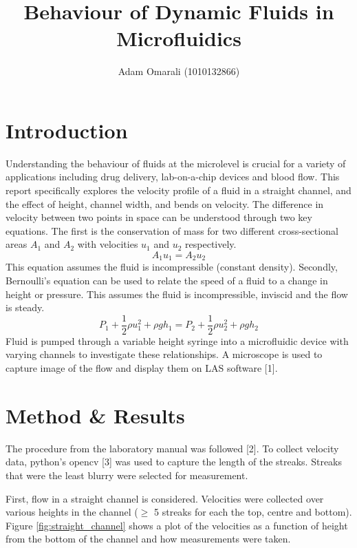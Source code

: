 \documentclass[12pt]{article}
\begin{document}
\vspace{-5cm}
\title{\bf{Behaviour of Dynamic Fluids in Microfluidics}}
\author{Adam Omarali (1010132866)}
\maketitle

\section{Introduction}
Understanding the behaviour of fluids at the microlevel is crucial for a variety of applications including drug delivery, lab-on-a-chip devices and blood flow. 
This report specifically explores the velocity profile of a fluid in a straight channel, and the effect of height, channel width, and bends on velocity.
The difference in velocity between two points in space can be understood through two key equations. The first is the conservation of mass for two different cross-sectional areas $A_1$ and $A_2$ with velocities $u_1$ and $u_2$ respectively.
\begin{equation}
    A_1u_1 = A_2u_2
    \label{eq:mass}
\end{equation}
This equation assumes the fluid is incompressible (constant density).
Secondly, Bernoulli's equation can be used to relate the speed of a fluid to a change in height or pressure. This assumes the fluid is incompressible, inviscid and the flow is steady.
\begin{equation}
    P_1 + \frac{1}{2}\rho u_1^2 + \rho gh_1 = P_2 + \frac{1}{2}\rho u_2^2 + \rho gh_2
    \label{eq:bernoulli}
\end{equation}
Fluid is pumped through a variable height syringe into a microfluidic device with varying channels to investigate these relationships. A microscope is used to capture image of the flow and display them on LAS software [1].

\section{Method \& Results}
The procedure from the laboratory manual was followed [2]. To collect velocity data, python's opencv [3] was used to capture the length of the streaks.
Streaks that were the least blurry were selected for measurement.

First, flow in a straight channel is considered. Velocities were collected over various heights in the channel ($\geq$ 5 streaks for each the top, centre and bottom). Figure \ref{fig:straight_channel} shows a plot of the velocities as a function of height from the bottom of the channel and how measurements were taken.
\end{document}
